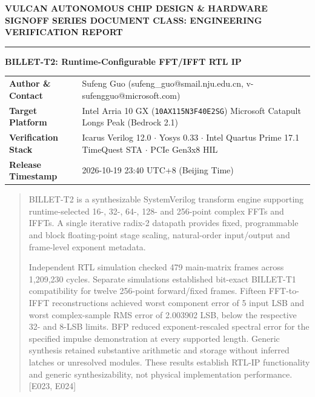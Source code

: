 \documentclass[11pt,a4paper]{article}
\begin{document}
{\footnotesize\sffamily\textcolor{vulcan}{\textbf{VULCAN AUTONOMOUS CHIP DESIGN \& HARDWARE SIGNOFF SERIES \hfill DOCUMENT CLASS: ENGINEERING VERIFICATION REPORT}}\par}

\vspace{2pt}\textcolor{vulcan}{\rule{\textwidth}{1.2pt}}\vspace{4pt}

{\sffamily\LARGE\raggedright\textbf{BILLET-T2: Runtime-Configurable FFT/\allowbreak{}IFFT RTL IP}\par}

\vspace{4pt}

{\footnotesize\sffamily\renewcommand{\arraystretch}{1.22}\begin{tabular}{@{}L{0.22\textwidth}L{0.74\textwidth}@{}}\toprule\textbf{Author \& Contact} & Sufeng Guo (\allowbreak{}sufeng\_\allowbreak{}guo@smail.nju.edu.cn,\allowbreak{} v-sufengguo@microsoft.com)\allowbreak{}\\\textbf{Target Platform} & Intel Arria 10 GX (\texttt{10AX115N3F40E2SG}) \textemdash{} Microsoft Catapult Longs Peak (Bedrock 2.1)\\\textbf{Verification Stack} & Icarus Verilog 12.0 $\cdot$ Yosys 0.33 $\cdot$ Intel Quartus Prime 17.1 TimeQuest STA $\cdot$ PCIe Gen3x8 HIL\\\textbf{Release Timestamp} & 2026-10-19 23:40 UTC+\allowbreak{}8 (\allowbreak{}Beijing Time)\allowbreak{}\\\bottomrule\end{tabular}\par}

\vspace{4pt}

\begin{abstract}\noindent 

BILLET-T2 is a synthesizable SystemVerilog transform engine supporting runtime-selected 16-,\allowbreak{} 32-,\allowbreak{} 64-,\allowbreak{} 128- and 256-point complex FFTs and IFFTs. A single iterative radix-2 datapath provides fixed,\allowbreak{} programmable and block floating-point stage scaling,\allowbreak{} natural-order input/\allowbreak{}output and frame-level exponent metadata.


Independent RTL simulation checked 479 main-matrix frames across 1,\allowbreak{}209,\allowbreak{}230 cycles. Separate simulations established bit-exact BILLET-T1 compatibility for twelve 256-point forward/\allowbreak{}fixed frames. Fifteen FFT-to-IFFT reconstructions achieved worst component error of 5 input LSB and worst complex-sample RMS error of 2.003902 LSB,\allowbreak{} below the respective 32- and 8-LSB limits. BFP reduced exponent-rescaled spectral error for the specified impulse demonstration at every supported length. Generic synthesis retained substantive arithmetic and storage without inferred latches or unresolved modules. These results establish RTL-IP functionality and generic synthesizability,\allowbreak{} not physical implementation performance. [\allowbreak{}E023,\allowbreak{} E024]\allowbreak{}


\end{abstract}
\end{document}
